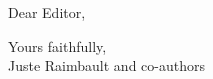 \documentclass[11pt,a4paper,sans]{moderncv}        %
\begin{document}
\date{\today}
\opening{Dear Editor,}
\closing{Yours faithfully,\\
Juste Raimbault and co-authors%
}




\justify



\medskip







\end{document}
